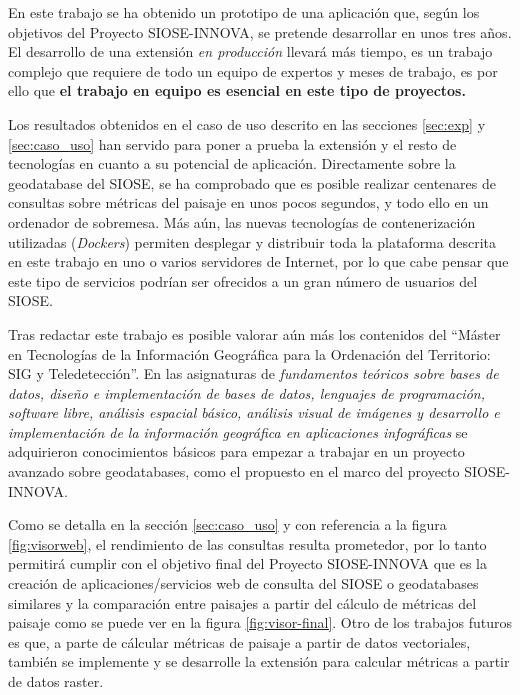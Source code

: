 En este trabajo se ha obtenido un prototipo de una aplicación que, según los objetivos del Proyecto SIOSE-INNOVA, se pretende desarrollar en unos tres años. El desarrollo de una extensión \textit{en producción} llevará más tiempo, es un trabajo complejo que requiere de todo un equipo de expertos y meses de trabajo, es por ello que \textbf{el trabajo en equipo es esencial en este tipo de proyectos.}

Los resultados obtenidos en el caso de uso descrito en las secciones \ref{sec:exp} y \ref{sec:caso_uso} han servido para poner a prueba la extensión y el resto de tecnologías en cuanto a su potencial de aplicación. Directamente sobre la geodatabase del SIOSE, se ha comprobado que es posible realizar centenares de consultas sobre métricas del paisaje en unos pocos segundos, y todo ello en un ordenador de sobremesa. Más aún, las nuevas tecnologías de contenerización utilizadas (\textit{Dockers}) permiten desplegar y distribuir toda la plataforma descrita en este trabajo en uno o varios servidores de Internet, por lo que cabe pensar que este tipo de servicios podrían ser ofrecidos a un gran número de usuarios del SIOSE.

Tras redactar este trabajo es posible valorar aún más los contenidos del ``Máster en Tecnologías de la Información Geográfica para la Ordenación del Territorio: SIG y Teledetección''. En las asignaturas de \textit{fundamentos teóricos sobre bases de datos, diseño e implementación de bases de datos, lenguajes de programación, software libre, análisis espacial básico, análisis visual de imágenes y desarrollo e implementación de la información geográfica en aplicaciones infográficas} se adquirieron conocimientos básicos para empezar a trabajar en un proyecto avanzado sobre geodatabases, como el propuesto en el marco del proyecto SIOSE-INNOVA.

Como se detalla en la sección \ref{sec:caso_uso} y con referencia a la figura \ref{fig:visorweb}, el rendimiento de las consultas resulta prometedor, por lo tanto permitirá cumplir con el objetivo final del Proyecto SIOSE-INNOVA que es la creación de aplicaciones/servicios web de consulta del SIOSE o geodatabases similares y la comparación entre paisajes a partir del cálculo de métricas del paisaje como se puede ver en la figura \ref{fig:visor-final}. Otro de los trabajos futuros es que, a parte de cálcular métricas de paisaje a partir de datos vectoriales, también se implemente y se desarrolle la extensión \pgland{} para calcular métricas a partir de datos raster.

